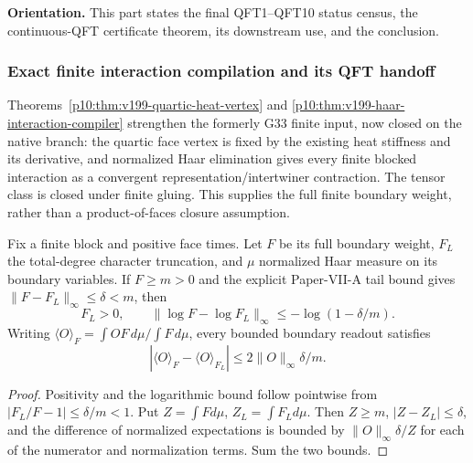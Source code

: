 \documentclass[12pt,a4paper]{article}
\begin{document}

\noindent\textbf{Orientation.}
This part states the final QFT1--QFT10 status census, the continuous-QFT certificate theorem, its downstream use, and the conclusion.


\subsubsection{Exact finite interaction compilation and its QFT handoff}
\label{p12:sec:v199-finite-tensor-handoff}
Theorems~\ref{p10:thm:v199-quartic-heat-vertex} and
\ref{p10:thm:v199-haar-interaction-compiler} strengthen the formerly G33 finite input, now closed on the native branch: the quartic face vertex is fixed by the existing heat stiffness and
its derivative, and normalized Haar elimination gives every finite blocked
interaction as a convergent representation/intertwiner contraction.
The tensor class is closed under finite gluing.  This supplies the full
finite boundary weight, rather than a product-of-faces closure assumption.

\begin{corollary}
\label{p12:cor:v199-finite-block-approximation}
Fix a finite block and positive face times.  Let \(F\) be its full boundary
weight, \(F_L\) the total-degree character truncation, and \(\mu\) normalized
Haar measure on its boundary variables.  If \(F\ge m>0\) and the explicit
Paper-VII-A tail bound gives \(\|F-F_L\|_\infty\le\delta<m\), then
\[
 F_L>0,\qquad \|\log F-\log F_L\|_\infty
 \le-\log(1-\delta/m).
\]
Writing \(\langle O\rangle_F=\int OF\,d\mu/\int F\,d\mu\), every
bounded boundary readout satisfies
\[
 |\langle O\rangle_F-\langle O\rangle_{F_L}|
 \le 2\|O\|_\infty\delta/m.
\]
\end{corollary}
\begin{proof}
Positivity and the logarithmic bound follow pointwise from
\(|F_L/F-1|\le\delta/m<1\).  Put \(Z=\int Fd\mu\),
\(Z_L=\int F_Ld\mu\).  Then \(Z\ge m\),
\(|Z-Z_L|\le\delta\), and the difference of normalized expectations is
bounded by \(\|O\|_\infty\delta/Z\) for each of the numerator and
normalization terms.  Sum the two bounds.
\end{proof}
\end{document}
